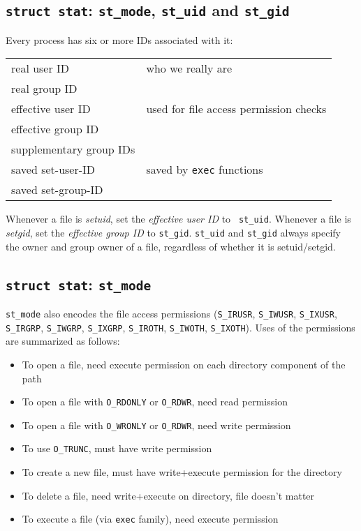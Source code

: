 \documentclass[xga]{xdvislides}
\begin{document}
\subsection{{\tt struct stat}: {\tt st\_mode}, {\tt st\_uid} and {\tt st\_gid}}
Every process has six or more IDs associated with it:
\\

\begin{tabular}{| l | l |}
	\hline
	real user ID & who we really are \\
	real group ID & \\
	\hline
	effective user ID & used for file access permission checks \\
	effective group ID & \\
	supplementary group IDs & \\
	\hline
	saved set-user-ID & saved by {\tt exec} functions \\
	saved set-group-ID & \\
	\hline
\end{tabular}
\vspace{.25in}

Whenever a file is {\em setuid}, set the {\em effective user ID} to {\tt
st\_uid}. Whenever a file is {\em setgid}, set the {\em effective group ID} to
{\tt st\_gid}.  {\tt st\_uid} and {\tt st\_gid} always specify the owner and
group owner of a file, regardless of whether it is setuid/setgid.

\subsection{{\tt struct stat}: {\tt st\_mode}}
{\tt st\_mode} also encodes the file access permissions ({\tt S\_IRUSR},
{\tt S\_IWUSR}, {\tt S\_IXUSR}, {\tt S\_IRGRP}, {\tt S\_IWGRP}, {\tt S\_IXGRP},
{\tt S\_IROTH}, {\tt S\_IWOTH}, {\tt S\_IXOTH}).  Uses of the permissions are
summarized as follows:

\begin{itemize}
	\item To open a file, need execute permission on each directory component of the path
	\item To open a file with {\tt O\_RDONLY} or {\tt O\_RDWR}, need read permission
	\item To open a file with {\tt O\_WRONLY} or {\tt O\_RDWR}, need write permission
	\item To use {\tt O\_TRUNC}, must have write permission
	\item To create a new file, must have write+execute permission for the directory
	\item To delete a file, need write+execute on directory, file doesn't matter
	\item To execute a file (via {\tt exec} family), need execute permission
\end{itemize}
\end{document}
